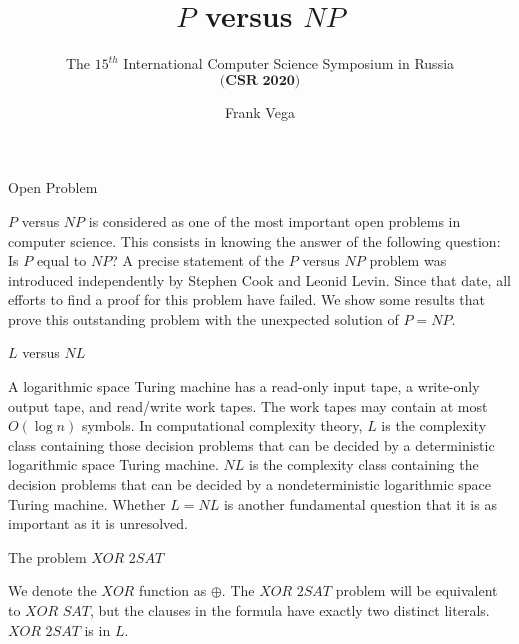 \documentclass[11pt]{beamer}
\begin{document}
\title{$P$ versus $NP$}

\subtitle{The $15^{th}$ International Computer Science Symposium in Russia\\
 $\textbf{(CSR 2020)}$}

\author{Frank Vega}



\maketitle

\begin{frame}{Open Problem}

$P$ versus $NP$ is considered as one of the most important open problems in computer science. This consists in knowing the answer of the following question: Is $P$ equal to $NP$? A precise statement of the $P$ versus $NP$ problem was introduced independently by Stephen Cook and Leonid Levin. Since that date, all efforts to find a proof for this problem have failed. We show some results that prove this outstanding problem with the unexpected solution of $P = NP$.

\end{frame}


\begin{frame}{$L$ versus $NL$}

A logarithmic space Turing machine has a read-only input tape, a write-only output tape, and read/write work tapes. The work tapes may contain at most $O(\log n)$ symbols. In computational complexity theory, $L$ is the complexity class containing those decision problems that can be decided by a deterministic logarithmic space Turing machine. $NL$ is the complexity class containing the decision problems that can be decided by a nondeterministic logarithmic space Turing machine. Whether $L = NL$ is another fundamental question that it is as important as it is unresolved.

\end{frame}

\begin{frame}{The problem $\textit{XOR 2SAT}$}

We denote the $XOR$ function as $\oplus$. The $\textit{XOR 2SAT}$ problem will be equivalent to $\textit{XOR SAT}$, but the clauses in the formula have exactly two distinct literals. $\textit{XOR 2SAT}$ is in $L$.

\end{frame}
\end{document}
